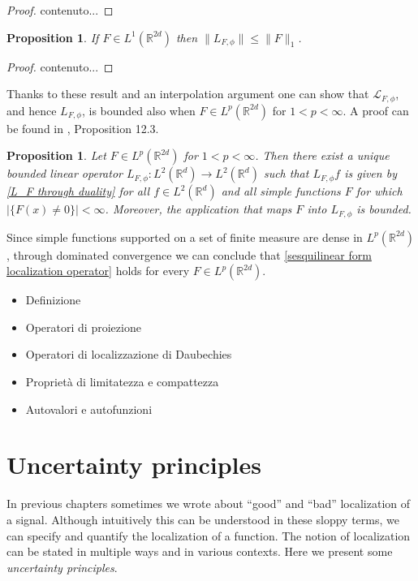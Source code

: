 \documentclass[corpo=11pt, stile=classica, tipotesi=custom,
greek, evenboxes, english]{toptesi}
\numberwithin{equation}{chapter}
\newtheorem{prop}[teo]{Proposition}
\newcommand{\R}{\mathbb{R}} %
\renewcommand{\L}{\mathscr{L}} %
\begin{document}
\begin{proof}
	contenuto...
\end{proof}
\begin{prop}\label{F integrable L_F bounded}
	If $F \in L^1(\R^{2d})$ then $\| L_{F,\phi}\| \leq \| F \|_1$.
\end{prop}
\begin{proof}
	contenuto...
\end{proof}
Thanks to these result and an interpolation argument one can show that $\L_{F,\phi}$, and hence $L_{F,\phi}$, is bounded also when $F \in L^p(\R^{2d})$ for $1 < p < \infty$. A proof can be found in \cite{wong}, Proposition 12.3.
\begin{prop}\label{F in Lp L_F bounded}
	Let $F \in L^p(\R^{2d})$ for $1 < p < \infty$. Then there exist a unique bounded linear operator $L_{F,\phi} : L^2(\R^d) \rightarrow L^2(\R^d)$ such that $L_{F,\phi} f$ is given by \eqref{L_F through duality} for all $f \in L^2(\R^d)$ and all simple functions $F$ for which $|\{F(x) \neq 0\}| < \infty$. Moreover, the application that maps $F$ into $L_{F,\phi}$ is bounded.
\end{prop}
{\color{blue} Since simple functions supported on a set of finite measure are dense in $L^p(\R^{2d})$, through dominated convergence we can conclude that \eqref{sesquilinear form localization operator} holds for every $F \in L^p(\R^{2d})$.}
\begin{itemize}
	\item Definizione
	\item Operatori di proiezione
	\item Operatori di localizzazione di Daubechies
	\item Proprietà di limitatezza e compattezza
	\item Autovalori e autofunzioni
\end{itemize}



\chapter{Uncertainty principles}\label{chapter uncertainty principles}
In previous chapters sometimes we wrote about ``good'' and ``bad'' localization of a signal. Although intuitively this can be understood in these sloppy terms, we can specify and quantify the localization of a function. The notion of localization can be stated in multiple ways and in various contexts. {\color{blue} Here we present some \emph{uncertainty principles}.}
\end{document}
